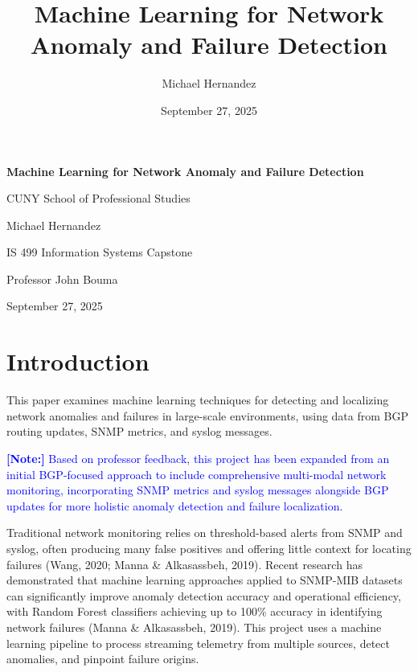 \documentclass[11pt]{article}
\title{Machine Learning for Network Anomaly and Failure Detection}
\author{Michael Hernandez}
\date{September 27, 2025}
\begin{document}
\begin{titlepage}
\centering
\vspace*{2cm}

{\Large \textbf{Machine Learning for Network Anomaly and Failure Detection}}

\vspace{1.5cm}

{\large CUNY School of Professional Studies}

\vspace{0.5cm}

{\large Michael Hernandez}

\vspace{0.5cm}

{\large IS 499 Information Systems Capstone}

\vspace{0.5cm}

{\large Professor John Bouma}

\vspace{0.5cm}

{\large September 27, 2025}

\vfill

\end{titlepage}

\tableofcontents
\newpage

\section{Introduction}

This paper examines machine learning techniques for detecting and localizing network anomalies and failures in large-scale environments, using data from BGP routing updates, SNMP metrics, and syslog messages.

\textcolor{blue}{\textbf{[Note:]} Based on professor feedback, this project has been expanded from an initial BGP-focused approach to include comprehensive multi-modal network monitoring, incorporating SNMP metrics and syslog messages alongside BGP updates for more holistic anomaly detection and failure localization.}

Traditional network monitoring relies on threshold-based alerts from SNMP and syslog, often producing many false positives and offering little context for locating failures (Wang, 2020; Manna \& Alkasassbeh, 2019). Recent research has demonstrated that machine learning approaches applied to SNMP-MIB datasets can significantly improve anomaly detection accuracy and operational efficiency, with Random Forest classifiers achieving up to 100\% accuracy in identifying network failures (Manna \& Alkasassbeh, 2019). This project uses a machine learning pipeline to process streaming telemetry from multiple sources, detect anomalies, and pinpoint failure origins.
\end{document}
